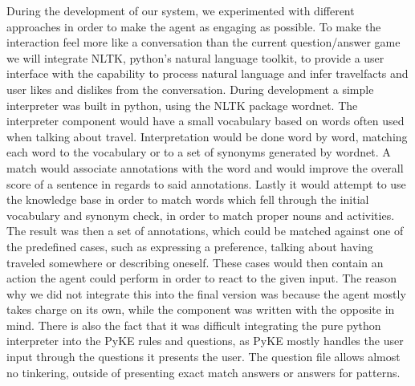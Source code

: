 \documentclass[11pt]{article} %
\begin{document}
During the development of our system, we experimented with different approaches in order to make the agent as engaging as possible. To make the interaction feel more like a conversation than the current question/answer game we will integrate NLTK, python's natural language toolkit, to provide a user interface with the capability to process natural language and infer travelfacts and user likes and dislikes from the conversation. 
During development a simple interpreter was built in python, using the NLTK package wordnet. 
The interpreter component would have a small vocabulary based on words often used when talking about travel. Interpretation would be done word by word, matching each word to 
the vocabulary or to a set of synonyms generated by wordnet. A match would associate annotations with the word and would improve the overall score of a sentence in regards to said annotations.
Lastly it would attempt to use the knowledge base in order to match words which fell through the initial vocabulary and synonym check, in order to match proper nouns and activities. 
The result was then a set of annotations, which could be matched against one of the predefined cases, such as expressing a preference, talking about having traveled somewhere or describing oneself. 
These cases would then contain an action the agent could perform in order to react to the given input. The reason why we did not integrate this into the final version was because the agent mostly takes charge on its own, while the component was 
written with the opposite in mind. There is also the fact that it was difficult integrating the pure python interpreter into the PyKE rules and questions, as PyKE mostly handles the user input through 
the questions it presents the user. The question file allows almost no tinkering, outside of presenting exact match answers or answers for patterns.
\end{document}
